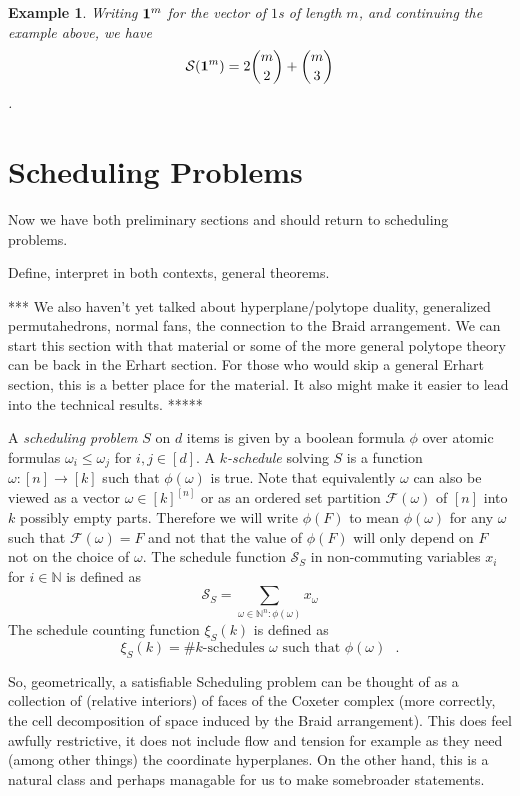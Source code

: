 \documentclass[12pt]{amsart}
\newtheorem{example}[definition]{Example}
\newcommand{\NN}{\mathbb{N}}
\newcommand{\SSS}{\mathcal{S}}
\newcommand{\FFF}{\mathcal{F}}
\newcommand{\defn}[1]{\emph{#1}}
\begin{document}
\begin{example}
Writing ${\bf 1}^m$ for the vector of $1$s of length $m$, and continuing the example above, we have 
$$ \mathcal{S}({\bf 1}^m) = 2 {m \choose 2} + {m \choose 3}$$.  

\end{example}


\section{Scheduling Problems}

Now we have both preliminary sections and should return to scheduling problems.

Define, interpret in both contexts, general theorems.  

*** We also haven't yet talked about hyperplane/polytope duality, generalized permutahedrons, normal fans, the connection to the Braid arrangement.  We can start this section with that material or some of the more general polytope theory can be back in the Erhart section.  For those who would skip a general Erhart section, this is a better place for the material.  It also might make it easier to lead into the technical results.  *****




A \defn{scheduling problem} $S$ on $d$ items is given by a boolean formula $\phi$ over atomic formulas $\omega_i\leq \omega_j$ for $i,j\in[d]$.
 A \defn{$k$-schedule} solving $S$ is a function $\omega:[n]\rightarrow[k]$ such that $\phi(\omega)$ is true. Note that equivalently $\omega$ can also be viewed as a vector $\omega\in [k]^{[n]}$ or as an ordered set partition $\FFF(\omega)$ of $[n]$ into $k$ possibly empty parts. Therefore we will write $\phi(F)$ to mean $\phi(\omega)$ for any $\omega$ such that $\FFF(\omega)=F$ and not that the value of $\phi(F)$ will only depend on $F$ not on the choice of $\omega$. The schedule function $\SSS_S$ in non-commuting variables $x_i$ for $i\in \NN$ is defined as
\[
  \SSS_S = \sum_{\omega\in \NN^n: \phi(\omega) } x_\omega
\] 
The schedule counting function $\xi_S(k)$ is defined as
\[
  \xi_S(k) = \# \text{$k$-schedules $\omega$ such that $\phi(\omega)$ }.
\]


So, geometrically, a satisfiable Scheduling problem can be thought of
as a collection of (relative interiors) of faces of the Coxeter
complex (more correctly, the cell decomposition of space induced by
the Braid arrangement).  This does feel awfully restrictive, it does
not include flow and tension for example as they need (among other
things) the coordinate hyperplanes.  On the other hand, this is a
natural class and perhaps managable for us to make somebroader
statements.
\end{document}
